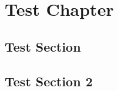 \documentclass[12pt]{book}
\begin{document}
	\chapter{Test Chapter}
	\lipsum[1]
	\section{Test Section}
	\lipsum[1-15]
	\newpage
	\section{Test Section 2}
	\lipsum[1-15]
\end{document}
